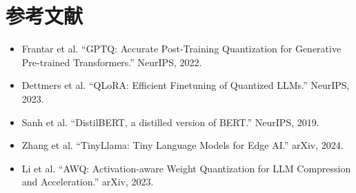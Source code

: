 \documentclass[UTF8,zihao=-4]{ctexart}
\begin{document}
\section*{参考文献}
\begin{itemize}
  \item Frantar et al. ``GPTQ: Accurate Post-Training Quantization for Generative Pre-trained Transformers.'' NeurIPS, 2022.
  \item Dettmers et al. ``QLoRA: Efficient Finetuning of Quantized LLMs.'' NeurIPS, 2023.
  \item Sanh et al. ``DistilBERT, a distilled version of BERT.'' NeurIPS, 2019.
  \item Zhang et al. ``TinyLlama: Tiny Language Models for Edge AI.'' arXiv, 2024.
  \item Li et al. ``AWQ: Activation-aware Weight Quantization for LLM Compression and Acceleration.'' arXiv, 2023.
\end{itemize}
\end{document}

